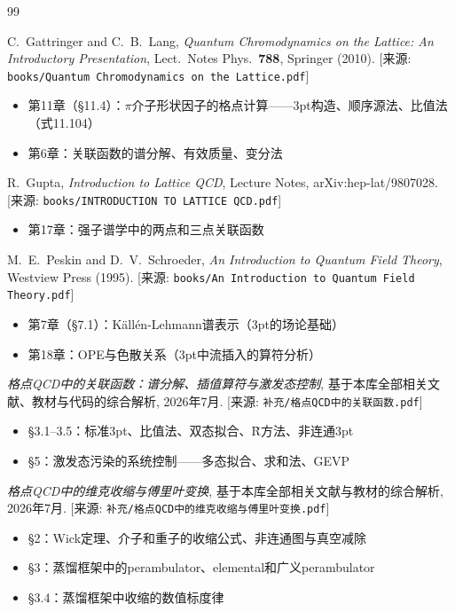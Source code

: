 \documentclass[12pt,a4paper]{ctexart}
\theoremstyle{definition}
\begin{document}
\begin{thebibliography}{99}

C.~Gattringer and C.~B.~Lang,
\textit{Quantum Chromodynamics on the Lattice: An Introductory Presentation},
Lect.\ Notes Phys.\ \textbf{788}, Springer (2010).
[来源: \texttt{books/Quantum Chromodynamics on the Lattice.pdf}]
\begin{itemize}
    \item 第11章（§11.4）：$\pi$介子形状因子的格点计算——3pt构造、顺序源法、比值法（式11.104）
    \item 第6章：关联函数的谱分解、有效质量、变分法
\end{itemize}

R.~Gupta,
\textit{Introduction to Lattice QCD},
Lecture Notes, arXiv:hep-lat/9807028.
[来源: \texttt{books/INTRODUCTION TO LATTICE QCD.pdf}]
\begin{itemize}
    \item 第17章：强子谱学中的两点和三点关联函数
\end{itemize}

M.~E.~Peskin and D.~V.~Schroeder,
\textit{An Introduction to Quantum Field Theory},
Westview Press (1995).
[来源: \texttt{books/An Introduction to Quantum Field Theory.pdf}]
\begin{itemize}
    \item 第7章（§7.1）：K\"all\'en-Lehmann谱表示（3pt的场论基础）
    \item 第18章：OPE与色散关系（3pt中流插入的算符分析）
\end{itemize}

\textit{格点QCD中的关联函数：谱分解、插值算符与激发态控制},
基于本库全部相关文献、教材与代码的综合解析, 2026年7月.
[来源: \texttt{补充/格点QCD中的关联函数.pdf}]
\begin{itemize}
    \item §3.1--3.5：标准3pt、比值法、双态拟合、R̃方法、非连通3pt
    \item §5：激发态污染的系统控制——多态拟合、求和法、GEVP
\end{itemize}

\textit{格点QCD中的维克收缩与傅里叶变换},
基于本库全部相关文献与教材的综合解析, 2026年7月.
[来源: \texttt{补充/格点QCD中的维克收缩与傅里叶变换.pdf}]
\begin{itemize}
    \item §2：Wick定理、介子和重子的收缩公式、非连通图与真空减除
    \item §3：蒸馏框架中的perambulator、elemental和广义perambulator
    \item §3.4：蒸馏框架中收缩的数值标度律
\end{itemize}


\end{thebibliography}
\end{document}
